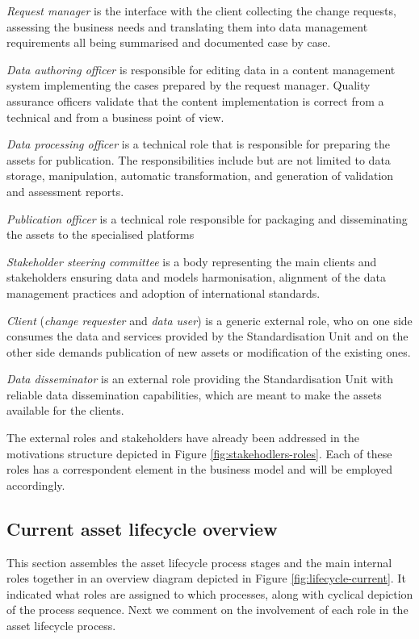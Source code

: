 	\textit{Request manager} is the interface with the client collecting the change requests, assessing the business needs and translating them into data management requirements all being summarised and documented case by case. 
	
	\textit{Data authoring officer} is responsible for editing data in a content management system implementing the cases prepared by the request manager.
	Quality assurance officers validate that the content implementation is correct from a technical and from a business point of view. 
	
	\textit{Data processing officer} is a technical role that is responsible for preparing the assets for publication. The responsibilities include but are not limited to data storage, manipulation, automatic transformation, and generation of validation and assessment reports. 
	
	\textit{Publication officer} is a technical role responsible for packaging and disseminating the assets to the specialised platforms
	
	\textit{Stakeholder steering committee} is a body representing the main clients and stakeholders ensuring data and models harmonisation, alignment of the data management practices and adoption of international standards.
	
	\textit{Client} (\textit{change requester} and \textit{data user}) is a generic external role, who on one side consumes the data and services provided by the Standardisation Unit and on the other side demands publication of new assets or modification of the existing ones. 
	
	\textit{Data disseminator} is an external role providing the Standardisation Unit with reliable data dissemination capabilities, which are meant to make the assets available for the clients.

	The external roles and stakeholders have already been addressed in the motivations structure depicted in Figure \ref{fig:stakehodlers-roles}. Each of these roles has a correspondent element in the business model and will be employed accordingly.

	\subsection{Current asset lifecycle overview}
	\label{sec:lifecycle-current}
	
	This section assembles the asset lifecycle process stages and the main internal roles together in an overview diagram depicted in Figure \ref{fig:lifecycle-current}. It indicated what roles are assigned to which processes, along with cyclical depiction of the process sequence. 
	Next we comment on the involvement of each role in the asset lifecycle process.  
	
